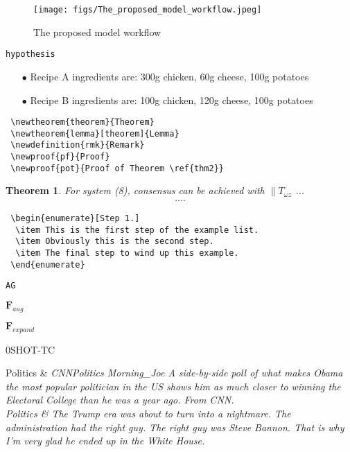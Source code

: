 \begin{figure}
	\centering
		\texttt{[image: figs/The\_proposed\_model\_workflow.jpeg]}
	\caption{The proposed model workflow}
	\label{model_workflow}
\end{figure}


{\verb|hypothesis|}


\begin{enumerate}
\item[$\bullet$] Recipe A ingredients are: 300g chicken, 60g cheese, 100g potatoes
\item[$\bullet$] Recipe B ingredients are: 100g chicken, 120g cheese, 100g potatoes
\end{enumerate}


\begin{verbatim}
 \newtheorem{theorem}{Theorem}
 \newtheorem{lemma}[theorem]{Lemma}
 \newdefinition{rmk}{Remark}
 \newproof{pf}{Proof}
 \newproof{pot}{Proof of Theorem \ref{thm2}}
\end{verbatim}


\newtheorem{theorem}{Theorem}

\begin{theorem}
For system (8), consensus can be achieved with 
$\|T_{\omega z}$ ...
\begin{eqnarray}\label{10}
....
\end{eqnarray}
\end{theorem}


\begin{verbatim}
 \begin{enumerate}[Step 1.]
  \item This is the first step of the example list.
  \item Obviously this is the second step.
  \item The final step to wind up this example.
 \end{enumerate}
\end{verbatim}





{\verb|AG|}


$\mathbf{F}_{aug}$

$\mathbf{F}_{expand}$


\textsc{0SHOT-TC}



{Politics} &  \itshape{CNNPolitics Morning_Joe A side-by-side poll of what makes Obama the most popular politician in the US shows him as much closer to winning the Electoral College than he was a year ago. From CNN.} \\
{Politics}  & \itshape{The Trump era was about to turn into a nightmare. The administration had the right guy. The right guy was Steve Bannon. That is why I'm very glad he ended up in the White House.} \\


